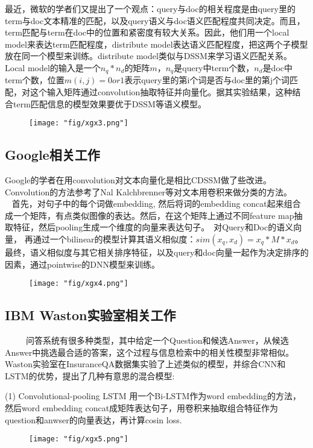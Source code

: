 最近，微软的学者们又提出了一个观点：query与doc的相关程度是由query里的term与doc文本精准的匹配，以及query语义与doc语义匹配程度共同决定。而且，term匹配与term在doc中的位置和紧密度有较大关系。因此，他们用一个local model来表达term匹配程度，distribute model表达语义匹配程度，把这两个子模型放在同一个模型来训练。distribute model类似与DSSM来学习语义匹配关系。Local model的输入是一个$n_q*n_d$的矩阵$m$，$n_q$是query中term个数，$n_d$是doc中term个数，位置$m(i,j)=0 or 1$表示query里的第i个词是否与doc里的第j个词匹配，对这个输入矩阵通过convolution抽取特征并向量化。据其实验结果，这种结合term匹配信息的模型效果要优于DSSM等语义模型。   
\begin{figure}[!h]
	\centering
	\texttt{[image: "fig/xgx3.png"]}
	\caption{}
	\label{fig:xgx3}
\end{figure}


\subsection{Google相关工作}
Google的学者在用convolution对文本向量化是相比CDSSM做了些改进。Convolution的方法参考了Nal Kalchbrenner等对文本用卷积来做分类的方法。       首先，对句子中的每个词做embedding, 然后将词的embedding concat起来组合成一个矩阵，有点类似图像的表达。然后，在这个矩阵上通过不同feature map抽取特征，然后pooling生成一个维度的向量来表达句子。 对Query和Doc的语义向量， 再通过一个bilinear的模型计算其语义相似度：$sim(x_q,x_d) = x_q * M * x_d$。 最终，语义相似度与其它相关排序特征，以及query和doc向量一起作为决定排序的因素，通过pointwise的DNN模型来训练。
\begin{figure}[!h]
	\centering
	\texttt{[image: "fig/xgx4.png"]}
	\caption{}
	\label{fig:xgx4}
\end{figure}

\subsection{IBM Waston实验室相关工作}
      问答系统有很多种类型，其中给定一个Question和候选Answer，从候选Answer中挑选最合适的答案，这个过程与信息检索中的相关性模型非常相似。Waston实验室在InsuranceQA数据集实验了上述类似的模型，并综合CNN和LSTM的优势，提出了几种有意思的混合模型:

(1) Convolutional-pooling LSTM 用一个Bi-LSTM作为word embedding的方法，然后word embedding concat成矩阵表达句子，用卷积来抽取组合特征作为question和anwser的向量表达，再计算cosin loss.
\begin{figure}[!h]
	\centering
	\texttt{[image: "fig/xgx5.png"]}
	\caption{}
	\label{fig:xgx5}
\end{figure}

